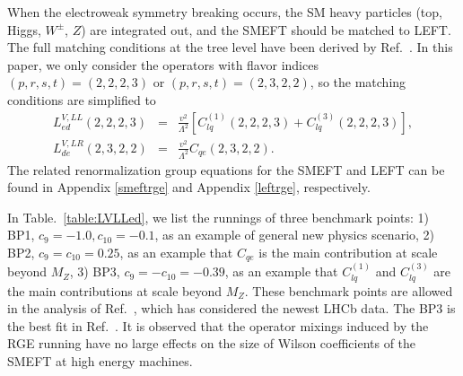 \documentclass[a4paper,11pt]{article}
\begin{document}
When the electroweak symmetry breaking occurs, the SM heavy particles (top, Higgs,  $W^\pm$,  $Z$) are integrated out, and the SMEFT should be matched to LEFT. 
The full matching conditions at the tree level have been derived by Ref.~\cite{Jenkins:2017jig}.
In this paper, we only consider the operators with flavor indices $(p,r,s,t)=(2,2,2,3)$ or $(p,r,s,t)=(2,3,2,2)$, so the matching conditions are simplified to 
\begin{eqnarray}
    L^{V,LL}_{ed}(2,2,2,3) &=& \frac{v^2}{\Lambda^2}\left[C^{(1)}_{lq}(2,2,2,3)+C^{(3)}_{lq}(2,2,2,3)\right],  \label{match:VLLed}\\
    L^{V,LR}_{de}(2,3,2,2)&=& \frac{v^2}{\Lambda^2}C_{qe}(2,3,2,2). \label{match:VLRde}
\end{eqnarray}
The related renormalization group equations for the SMEFT and LEFT can be found in Appendix \ref{smeftrge} and Appendix \ref{leftrge}, respectively.

In Table.~\ref{table:LVLLed}, we list the runnings of three benchmark points: 
1) BP1, $c_{9}=-1.0, c_{10}=-0.1$, as an example of general new physics scenario, 
2) BP2, $c_{9}=c_{10}=0.25$, as an example that $C_{qe}$ is the main contribution at scale beyond $M_Z$,
3) BP3, $c_{9}=-c_{10}=-0.39$, as an example that $C^{(1)}_{lq}$ and $C^{(3)}_{lq}$ are the main contributions at scale beyond $M_Z$. 
These benchmark points are allowed in the analysis of Ref.~\cite{Ciuchini:2022wbq}, 
which has considered the newest LHCb data.
The BP3 is the best fit in Ref.~\cite{Altmannshofer:2021qrr}. 
It is observed that the operator mixings induced by the RGE running have no large effects on the size of Wilson coefficients of the SMEFT at high energy machines.
\end{document}
